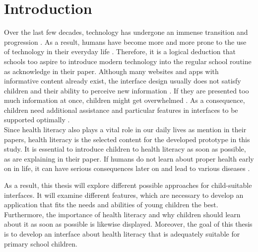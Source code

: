 \section{Introduction}
\label{section:Introduction}
Over the last few decades, technology has undergone an immense transition and progression \autocite{walker2000screen, sharmin2012effect}. As a result, humans have become more and more prone to the use of technology in their everyday life \autocite{gikas2013mobile, gossen2012search}. Therefore, it is a logical deduction that schools too aspire to introduce modern technology into the regular school routine as \autocite{walker2000screen} acknowledge in their paper. Although many websites and apps with informative content already exist, the interface design usually does not satisfy children and their ability to perceive new information \autocite{alhussayen2015evaluating}. If they are presented too much information at once, children might get overwhelmed \autocite{gossen2012search}. As a consequence, children need additional assistance and particular features in interfaces to be supported optimally \autocite{gossen2012search, alhussayen2015evaluating, gan2015enhancing}.\\
Since health literacy also plays a vital role in our daily lives as  \textcite{manganello2007health, paakkari2012health} mention in their papers, health literacy is the selected content for the developed prototype in this study. It is essential to introduce children to health literacy as soon as possible, as \textcite{manganello2007health, paakkari2012health, velardo2017emphasizing} are explaining in their paper. If humans do not learn about proper health early on in life, it can have serious consequences later on and lead to various diseases \autocite{velardo2017emphasizing, jordan2015gesundheitskompetenz}.

As a result, this thesis will explore different possible approaches for child-suitable interfaces. It will examine different features, which are necessary to develop an application that fits the needs and abilities of young children the best. Furthermore, the importance of health literacy and why children should learn about it as soon as possible is likewise displayed.
Moreover, the goal of this thesis is to develop an interface about health literacy that is adequately suitable for primary school children.

